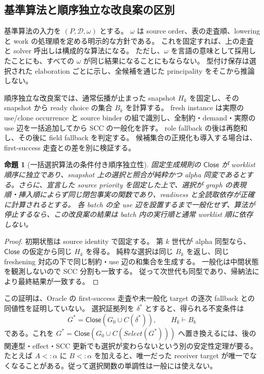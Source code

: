 \documentclass[11pt,a4paper]{article}
\newtheorem{theorem}{命題}[section]
\theoremstyle{remark}
\newcommand{\Close}{\mathsf{Close}}
\begin{document}
\subsection{基準算法と順序独立な改良案の区別}

基準算法の入力を $(P,\mathcal D,\omega)$ とする。
$\omega$ は source order、表の走査順、lowering と work の処理順を定める明示的な方針である。
これを固定すれば、上の走査と solver 呼出しは構成的な算法になる。
ただし、$\omega$ を言語の意味として採用したことにも、すべての $\omega$ が同じ結果になることにもならない。
型付け保存は選択された elaboration ごとに示し、全候補を通じた principality をそこから推論しない。

順序独立な改良案では、通常伝播が止まった snapshot $H_k$ を固定し、その snapshot から ready choice の集合 $B_k$ を計算する。
fresh instance は実際の use/clone occurrence と source binder の組で識別し、全制約・demand・実際の use 辺を一括追加してから SCC の一般化を許す。
role fallback の後は再飽和し、その後に field fallback を判定する。
候補集合の正規化も導入する場合は、first-success 走査との差を別に検証する。

\begin{theorem}[一括選択算法の条件付き順序独立性]
固定生成規則の $\Close$ が worklist 順序に独立であり、snapshot 上の選択と照合が純粋かつ alpha 同変であるとする。さらに、宣言した source priority を固定した上で、選択が graph の表現順・挿入順によらず同じ閉包事実の関数であり、readiness と全読取依存が正確に計算されるとする。
各 batch の全 use 辺を設置するまで一般化せず、算法が停止するなら、この改良案の結果は batch 内の実行順と通常 worklist 順に依存しない。
\end{theorem}
\begin{proof}
初期状態は source identity で固定する。
第 $k$ 世代が alpha 同型なら、$\Close$ の仮定から同じ $H_k$ を得る。
純粋な選択は同じ $B_k$ を返し、同じ freshening 対応の下で同じ制約・use 辺の和集合を生成する。
一般化は中間状態を観測しないので SCC 分割も一致する。
従って次世代も同型であり、帰納法により最終結果が一致する。
\end{proof}

この証明は、Oracle の first-success 走査や未一般化 target の逐次 fallback との同値性を証明していない。
選択証拠列を $\delta^*$ とすると、得られる不変条件は
\[
G^*=\Close(G_0\cup C(\delta^*)),\qquad H_k\vdash B_k
\]
である。これを $G^*=\Close(G_0\cup C(Select(G^*)))$ へ置き換えるには、後の関連型・effect・SCC 更新でも選択が変わらないという別の安定性定理が要る。
たとえば $A<:\alpha$ に $B<:\alpha$ を加えると、唯一だった receiver target が唯一でなくなることがある。従って選択関数の単調性は一般には使えない。
\end{document}
